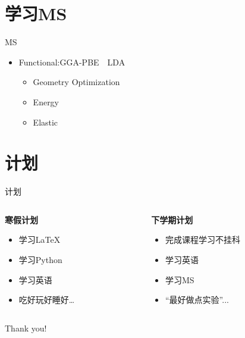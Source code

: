 \documentclass{beamer}
\begin{document}
\section{学习MS}

\begin{frame}{MS}
	\begin{itemize}
		\item Functional:GGA-PBE~~LDA
		\begin{itemize}
			\item Geometry Optimization
			\item Energy
			\item Elastic
		\end{itemize}
	\end{itemize}
\end{frame}

\section{计划}
	\begin{frame}{计划}
		\begin{columns}
			\begin{column}{0.6\textwidth}
				\textbf{寒假计划}
					\begin{itemize}
						\item 学习\LaTeX
						\item 学习Python
						\item 学习英语
						\item 吃好玩好睡好\dots 
					\end{itemize}
			\end{column}
			
			\begin{column}{0.4\textwidth}
				\textbf{下学期计划}
					\begin{itemize}
						\item 完成课程学习不挂科
						\item 学习英语
						\item 学习MS
						\item “最好做点实验”...
					\end{itemize}
			\end{column}
		\end{columns}
\hyperlink{start}{}
	\end{frame}
\begin{frame}
	\begin{center}
		{\Huge\calligra Thank you!}
	\end{center}		
\end{frame}
		
\end{document}
